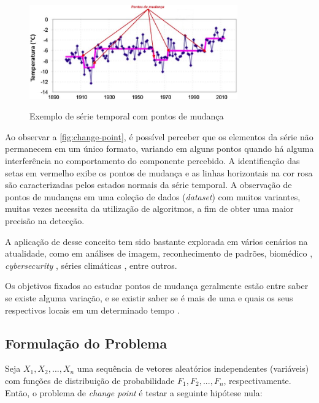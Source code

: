 \begin{figure}[!htb]
    \centering
    \caption{Exemplo de série temporal com pontos de mudança}
    \includegraphics[width=0.8\textwidth]{./dados/figuras/pontos-de-mudanca}
    \label{fig:change-point}
\end{figure}

Ao observar a \autoref{fig:change-point}, é possível perceber que os elementos da série não permanecem em um único formato, variando em alguns pontos quando há alguma interferência no comportamento do componente percebido. A identificação das setas em vermelho exibe os pontos de mudança e as linhas horizontais na cor rosa são caracterizadas pelos estados normais da série temporal. A observação de pontos de mudanças em uma coleção de dados (\textit{dataset}) com muitos variantes, muitas vezes necessita da utilização de algoritmos, a fim de obter uma maior precisão na detecção. 

A aplicação de desse conceito tem sido bastante explorada em vários cenários na atualidade, como em análises de imagem, reconhecimento de padrões, biomédico \cite{Fan2015}, \textit{cybersecurity} \cite{Polunchenko2012}, séries climáticas \cite{Bates2012}, entre outros. 

Os objetivos fixados ao estudar pontos de mudança geralmente estão entre saber se existe alguma variação, e se existir saber se é mais de uma e quais os seus respectivos locais em um determinado tempo \cite{Chen1-2000}.

\subsection{Formulação do Problema}

Seja $X_1, X_2, ..., X_n$ uma sequência de vetores aleatórios independentes (variáveis) com funções de distribuição de probabilidade $F_1, F_2, ..., F_n$, respectivamente. Então, o problema de \textit{change point} é testar a seguinte hipótese nula:

